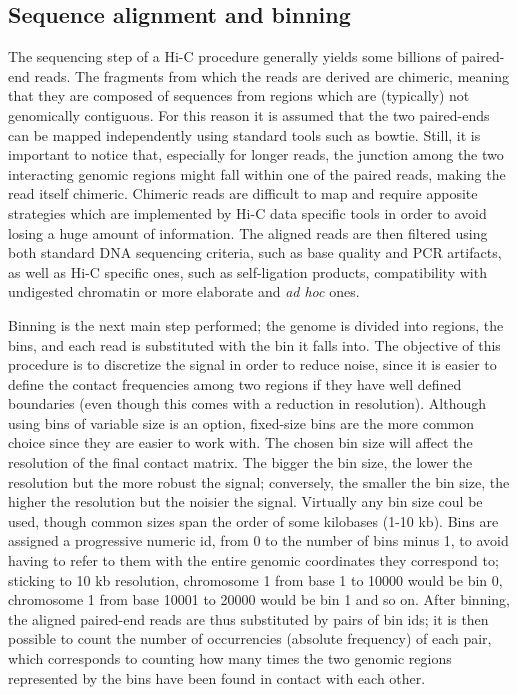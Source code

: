 \subsection{Sequence alignment and binning}
The sequencing step of a Hi-C procedure generally yields some billions of paired-end reads. The fragments from which the reads are derived are chimeric, meaning that they are composed of sequences from regions which are (typically) not genomically contiguous. For this reason it is assumed that the two paired-ends can be mapped independently using standard tools such as bowtie. Still, it is important to notice that, especially for longer reads, the junction among the two interacting genomic regions might fall within one of the paired reads, making the read itself chimeric. Chimeric reads are difficult to map and require apposite strategies which are implemented by Hi-C data specific tools in order to avoid losing a huge amount of information. The aligned reads are then filtered using both standard DNA sequencing criteria, such as base quality and PCR artifacts, as well as Hi-C specific ones, such as self-ligation products, compatibility with undigested chromatin\cite{readfiltering2013} or more elaborate and \emph{ad hoc} ones\cite{complexfiltering2017}.

Binning is the next main step performed; the genome is divided into regions, the bins, and each read is substituted with the bin it falls into. The objective of this procedure is to discretize the signal in order to reduce noise, since it is easier to define the contact frequencies among two regions if they have well defined boundaries (even though this comes with a reduction in resolution).
Although using bins of variable size is an option, fixed-size bins are the more common choice since they are easier to work with. The chosen bin size will affect the resolution of the final contact matrix. The bigger the bin size, the lower the resolution but the more robust the signal; conversely, the smaller the bin size, the higher the resolution but the noisier the signal. Virtually any bin size coul be used, though common sizes span the order of some kilobases (1-10 kb). Bins are assigned a progressive numeric id, from 0 to the number of bins minus 1, to avoid having to refer to them with the entire genomic coordinates they correspond to; sticking to 10 kb resolution, chromosome 1 from base 1 to 10000 would be bin 0, chromosome 1 from base 10001 to 20000 would be bin 1 and so on. After binning, the aligned paired-end reads are thus substituted by pairs of bin ids; it is then possible to count the number of occurrencies (absolute frequency) of each pair, which corresponds to counting how many times the two genomic regions represented by the bins have been found in contact with each other. 

